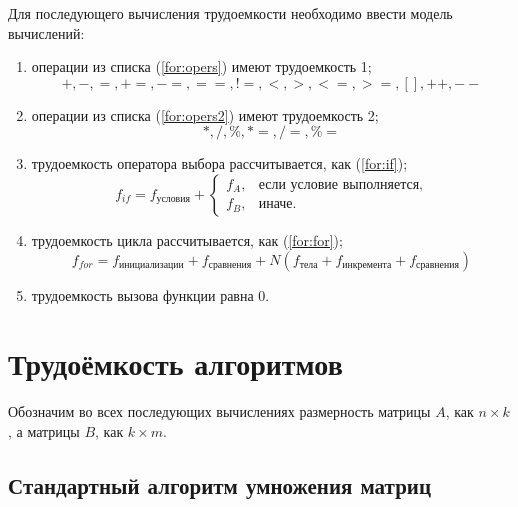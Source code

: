 Для последующего вычисления трудоемкости необходимо ввести модель вычислений:
\begin{enumerate}
    \item операции из списка (\ref{for:opers}) имеют трудоемкость 1;
        \begin{equation}
            \label{for:opers}
            +, -, =, +=, -=, ==, !=, <, >, <=, >=, [], ++, {-}-
        \end{equation}
    \item операции из списка (\ref{for:opers2}) имеют трудоемкость 2;
        \begin{equation}
            \label{for:opers2}
            *, /, \%, *=, /=, \%=
        \end{equation}
    \item трудоемкость оператора выбора  рассчитывается, как (\ref{for:if});
        \begin{equation}
            \label{for:if}
            f_{if} = f_{\text{условия}} +
            \begin{cases}
            f_A, & \text{если условие выполняется,}\\
            f_B, & \text{иначе.}
            \end{cases}
        \end{equation}
    \item трудоемкость цикла рассчитывается, как (\ref{for:for});
        \begin{equation}
            \label{for:for}
            f_{for} = f_{\text{инициализации}} + f_{\text{сравнения}} + N(f_{\text{тела}} + f_{\text{инкремента}} + f_{\text{сравнения}})
        \end{equation}
	\item трудоемкость вызова функции равна 0.
\end{enumerate}

\section{Трудоёмкость алгоритмов}

Обозначим во всех последующих вычислениях размерность матрицы $A$, как $n \times k$, а матрицы $B$, как $k \times m$.

\subsection{Стандартный алгоритм умножения матриц}

